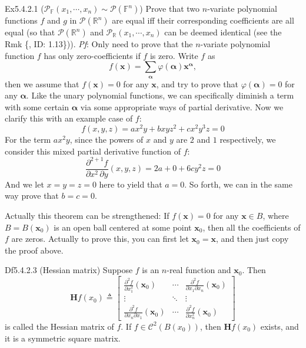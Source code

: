 \documentclass{article}
\newcommand{\biparfrac}[2]{\frac{\partial^2 #1}{#2}}
\begin{document}
\begin{Th}{Ex5.4.2.1 ($\mathcal{P}_\mathbb{F}(x_1,\cdots, x_n)\sim\mathcal{P}(\mathbb{F}^n)$)}
    Prove that two $n$-variate polynomial functions $f$ and $g$ in $\mathcal{P}(\mathbb{R}^n)$ are equal iff their corresponding coefficients are all equal (so that $\mathcal{P}(\mathbb{R}^n)$ and $\mathcal{P}_\mathbb{R}(x_1, \cdots, x_n)$ can be deemed identical (see the Rmk \{, ID: 1.13\})).
    \textit{Pf}: Only need to prove that the $n$-variate polynomial function $f$ has only zero-coefficients if $f$ is zero. Write $f$ as
    $$ f(\pmb{x}) = \sum_{\pmb{\alpha}} \varphi(\pmb{\alpha}) \pmb{x}^{\pmb{\alpha}}, $$
    then we assume that $f(\pmb{x}) = 0$ for any $\pmb{x}$, and try to prove that $\varphi(\pmb{\alpha}) = 0$ for any $\pmb{\alpha}$. Like the unary polynomial functions, we can specifically diminish a term with some certain $\pmb{\alpha}$ via some appropriate ways of partial derivative. Now we clarify this with an example case of $f$:
    $$ f(x,y,z) = ax^2y+bxyz^2+cx^2y^3z = 0 $$
    For the term $ax^2y$, since the powers of $x$ and $y$ are $2$ and $1$ respectively, we consider this mixed partial derivative function of $f$: 
    $$ \frac{\partial^{2+1} f}{\partial x^2\,\partial y}(x,y,z) = 2a+0+6cy^2z = 0 $$
    And we let $x=y=z=0$ here to yield that $a=0$. So forth, we can in the same way prove that $b=c=0$.
\end{Th}

\begin{Rmk}{}
    Actually this theorem can be strengthened: \textcolor{Th}{If $f(\pmb{x})=0$ for any $\pmb{x}\in B$, where $B = B(\pmb{x}_0)$ is an open ball centered at some point $\pmb{x}_0$, then all the coefficients of $f$ are zeros.} Actually to prove this, you can first let $\pmb{x}_0 = \pmb{x}$, and then just copy the proof above.
\end{Rmk}

\begin{Df}{Df5.4.2.3 (Hessian matrix)}
    Suppose $f$ is an $n$-real function and $\pmb{x}_0$. Then
    $$ \pmb{H} f(x_0) \triangleq 
    \begin{bmatrix}
        \biparfrac{f}{\partial x_1^2}(\pmb{x}_0) & \cdots & \biparfrac{f}{\partial x_1 \partial x_n}(\pmb{x}_0) \\
        \vdots & \ddots & \vdots \\
        \biparfrac{f}{\partial x_n \partial x_1}(\pmb{x}_0) & \cdots & \biparfrac{f}{\partial x_n^2}(\pmb{x}_0)
    \end{bmatrix}
    $$
    is called the Hessian matrix of $f$. \textcolor{Th}{If $f\in\mathcal{C}^2(B(x_0))$, then $\pmb{H}f(x_0)$ exists, and it is a symmetric square matrix.}
\end{Df}
\end{document}
